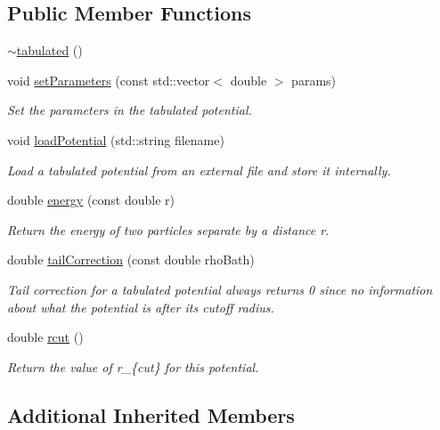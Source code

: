 \subsection*{Public Member Functions}
\begin{DoxyCompactItemize}
\item 
\hyperlink{classtabulated_a069eb60dc00583fd48b7488c9b9ada38}{$\sim$tabulated} ()
\item 
void \hyperlink{classtabulated_a6a52e8a5b99ddd16fcbd3e404c90f559}{set\+Parameters} (const std\+::vector$<$ double $>$ params)
\begin{DoxyCompactList}\small\item\em Set the parameters in the tabulated potential. \end{DoxyCompactList}\item 
void \hyperlink{classtabulated_ad3b3fb94b5db44e91d6768cfe21683c3}{load\+Potential} (std\+::string filename)
\begin{DoxyCompactList}\small\item\em Load a tabulated potential from an external file and store it internally. \end{DoxyCompactList}\item 
double \hyperlink{classtabulated_a09fdfccca3e19adb68da74f0baac7423}{energy} (const double r)
\begin{DoxyCompactList}\small\item\em Return the energy of two particles separate by a distance r. \end{DoxyCompactList}\item 
double \hyperlink{classtabulated_afb2936dfc0ba4255eb06f9d81e594dd2}{tail\+Correction} (const double rho\+Bath)
\begin{DoxyCompactList}\small\item\em Tail correction for a tabulated potential always returns 0 since no information about what the potential is after its cutoff radius. \end{DoxyCompactList}\item 
double \hyperlink{classtabulated_a1826f920afd53d74e17c8fa5253a2d2b}{rcut} ()
\begin{DoxyCompactList}\small\item\em Return the value of r\+\_\+\{cut\} for this potential. \end{DoxyCompactList}\end{DoxyCompactItemize}
\subsection*{Additional Inherited Members}


